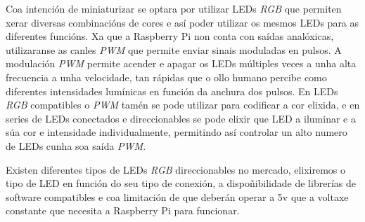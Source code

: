 Coa intención de miniaturizar se optara por utilizar LEDs \emph{RGB} que permiten xerar diversas combinacións de cores e así poder utilizar os mesmos LEDs para as diferentes funcións.
Xa que a Raspberry Pi non conta con saídas analóxicas, utilizaranse as canles \emph{PWM} que permite enviar sinais moduladas en pulsos. A modulación \emph{PWM} permite acender e apagar os LEDs múltiples veces a unha alta frecuencia a unha velocidade, tan rápidas que o ollo humano percibe como diferentes intensidades lumínicas en función da anchura dos pulsos. En LEDs \emph{RGB} compatibles o \emph{PWM} tamén se pode utilizar para codificar a cor elixida, e en series de LEDs conectados e direccionables se pode elixir que LED a iluminar e a súa cor e intensidade individualmente, permitindo así controlar un alto numero de LEDs cunha soa saída \emph{PWM}.

Existen diferentes tipos de LEDs \emph{RGB} direccionables no mercado, elixiremos o tipo de LED en función do seu tipo de conexión, a dispoñibilidade de librerías de software compatibles e coa limitación de que deberán operar a 5v que a voltaxe constante que necesita a Raspberry Pi para funcionar.\\

